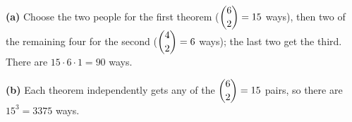 \textbf{(a)} Choose the two people for the first theorem ($\dbinom62=15$ ways), then two of the remaining four for the second ($\dbinom42=6$ ways); the last two get the third. There are $15\cdot6\cdot1=\boxed{90}$ ways.

\textbf{(b)} Each theorem independently gets any of the $\dbinom62=15$ pairs, so there are $15^3=\boxed{3375}$ ways.
